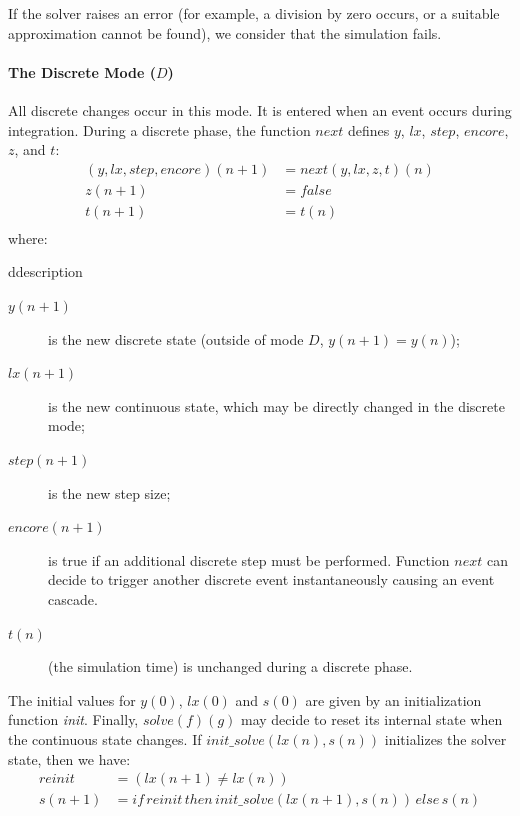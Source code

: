 \documentclass[11pt,titlepage,twoside]{report}
\newenvironment{ddescription}
  {\begin{divstyle}{ddescription}\begin{description}}
  {\end{description}\end{divstyle}}
\newenvironment{ddescription}
  {\begin{description}[leftmargin=6.0em,style=multiline]}
  {\end{description}}
\newcommand{\lx}{\ensuremath{\mathit{lx}}}
\newcommand{\step}{\ensuremath{\mathit{step}}}
\newcommand{\encore}{\ensuremath{\mathit{encore}}}
\newcommand{\Solve}[2]{\mathit{solve}({#1})({#2})}
\newcommand{\Ifthenelse}[3]
   {\mathit{if}\,{#1}\,\mathit{then}\,{#2}\,\mathit{else}\,{#3}}
\newcommand{\bR}{\mathbb{R}}
\begin{document}
If the solver raises an error (for example, a division by zero occurs, or a 
suitable approximation cannot be found), we consider that the simulation 
fails.

\paragraph{The Discrete Mode ($D$)}
All discrete changes occur in this mode.
It is entered when an event occurs during integration.
During a discrete phase, the function $\mathit{next}$ defines $y$, $\lx$, 
$\step$, $\encore$, $z$, and $t$:
\begin{align*}
(y, \lx, step, encore%
)(n+1) & = next (y, \lx, z, t)(n) \\
z(n+1) & = false \\
t(n+1) & = t(n) \\
\end{align*}
where:
\begin{ddescription}


\item[$y(n+1)$] is the new discrete state (outside of mode $D$, $y(n+1) = 
y(n)$);

\item[$\lx(n+1)$] is the new continuous state, which may be directly changed 
in the discrete mode; %

\item[$\step(n+1)$] is the new step size;

\item[$\encore(n+1)$] is true if an additional discrete step must be
  performed. Function $\mathit{next}$ can decide to trigger another discrete 
  event instantaneously causing an event cascade.

\item[$t(n)$] (the simulation time) is unchanged during a discrete phase.
\end{ddescription}
%
The initial values for $y(0)$, $\lx(0)$ and $s(0)$ are given by an
initialization function \textit{init}. Finally, $\Solve{f}{g}$ may
decide to reset its internal state when the continuous state
changes. If $init\_solve(\lx(n), s(n))$ initializes the solver state, then
we have:
\begin{align*}
reinit &= (\lx(n+1) \not= \lx(n)) \\
s(n+1) &= \Ifthenelse{reinit}{init\_solve(\lx(n+1), s(n))}{s(n)} \\
\end{align*}
\end{document}
